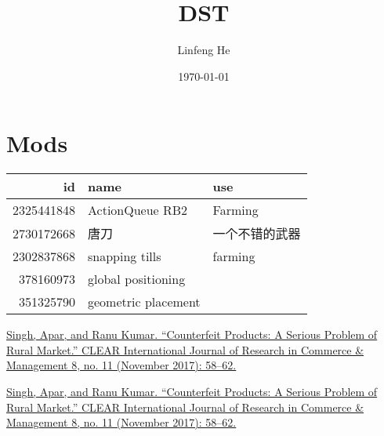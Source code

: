 \documentclass[11pt]{article}
\author{Linfeng  He}
\date{\today}
\title{DST}
\begin{document}
\maketitle
\tableofcontents

\section{Mods}
\label{sec:org3cc3d65}
\begin{center}
\begin{tabular}{rll}
id & name & use\\
\hline
2325441848 & ActionQueue RB2 & Farming\\
2730172668 & 唐刀 & 一个不错的武器\\
2302837868 & snapping tills & farming\\
378160973 & global positioning & \\
351325790 & geometric placement & \\
\end{tabular}
\end{center}
\href{//select/items/1\_KWW5ISFI}{Singh, Apar, and Ranu Kumar. “Counterfeit Products: A Serious Problem of Rural Market.” CLEAR International Journal of Research in Commerce \& Management 8, no. 11 (November 2017): 58–62.}

\href{//select/items/1\_KWW5ISFI}{Singh, Apar, and Ranu Kumar. “Counterfeit Products: A Serious Problem of Rural Market.” CLEAR International Journal of Research in Commerce \& Management 8, no. 11 (November 2017): 58–62.}
\end{document}
